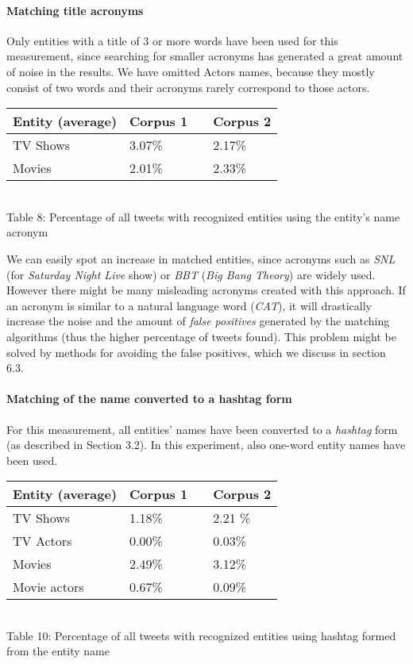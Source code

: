 \paragraph{Matching title acronyms}
Only entities with a title of 3 or more words have been used for this measurement, since searching
for smaller acronyms has generated a great amount of noise in the results. We have omitted Actors names, because
they mostly consist of two words and their acronyms rarely correspond to those actors.

\begin{center}
  \begin{tabular}{ | p{4cm} | p{2cm} | p{1cm}| p{2cm} | } \hline
    Entity (average) & Corpus 1 & & Corpus 2 \\ \hline
    TV Shows & 3.07\% & & 2.17\% \\ \hline
    Movies & 2.01\% & & 2.33\% \\ \hline
  \end{tabular} \\
  Table 8: Percentage of all tweets with recognized entities using the entity's name acronym \\
\end{center}

We can easily spot an increase in matched entities, since acronyms such as \textit{SNL}
(for \textit{Saturday Night Live} show) or \textit{BBT} (\textit{Big Bang Theory}) are widely used.
However there might be many misleading acronyms created with this approach. If an acronym is similar
to a natural language word (\eg \textit{CAT}), it will drastically increase the noise and the amount
of \textit{false positives} generated by the matching algorithms (thus the higher percentage of tweets
found). This problem might be solved by methods for avoiding the false positives, which we discuss in section 6.3.

\paragraph{Matching of the name converted to a hashtag form}
For this measurement, all entities' names have been converted to a \textit{hashtag} form (as described
in Section 3.2). In this experiment, also one-word entity names have been used.

\begin{center}
  \begin{tabular}{ | p{4cm} | p{2cm} | p{1cm}| p{2cm} | } \hline
    Entity (average) & Corpus 1 & & Corpus 2 \\ \hline
    TV Shows & 1.18\% & & 2.21 \% \\ \hline
    TV Actors & 0.00\% & & 0.03\% \\ \hline
    Movies & 2.49\% & & 3.12\% \\ \hline
    Movie actors & 0.67\% & & 0.09\% \\ \hline
  \end{tabular} \\
  Table 10: Percentage of all tweets with recognized entities using hashtag formed from the entity name \\
\end{center}

